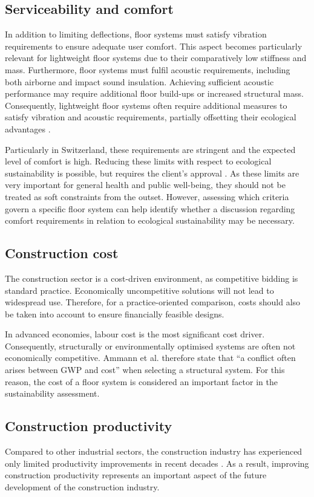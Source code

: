 \subsection{Serviceability and comfort \label{Sec: ServAndComf}}
In addition to limiting deflections, floor systems must satisfy vibration requirements to ensure adequate user comfort. This aspect becomes particularly relevant for lightweight floor systems due to their comparatively low stiffness and mass. Furthermore, floor systems must fulfil acoustic requirements, including both airborne and impact sound insulation. Achieving sufficient acoustic performance may require additional floor build-ups or increased structural mass. Consequently, lightweight floor systems often require additional measures to satisfy vibration and acoustic requirements, partially offsetting their ecological advantages \cite{BauphysikKalender}.

Particularly in Switzerland, these requirements are stringent and the expected level of comfort is high. Reducing these limits with respect to ecological sustainability is possible, but requires the client's approval \cite{Kaufmann2024_WhitePaper}. As these limits are very important for general health and public well-being, they should not be treated as soft constraints from the outset. However, assessing which criteria govern a specific floor system can help identify whether a discussion regarding comfort requirements in relation to ecological sustainability may be necessary.

\subsection{Construction cost \label{Sec: ConstructionCost}}
The construction sector is a cost-driven environment, as competitive bidding is standard practice. Economically uncompetitive solutions will not lead to widespread use. Therefore, for a practice-oriented comparison, costs should also be taken into account to ensure financially feasible designs.

In advanced economies, labour cost is the most significant cost driver. Consequently, structurally or environmentally optimised systems are often not economically competitive. Ammann et al. \cite{Ammann2024} therefore state that “a conflict often arises between GWP and cost” when selecting a structural system. For this reason, the cost of a floor system is considered an important factor in the sustainability assessment.

\subsection{Construction productivity \label{Sec: Productivity}}
Compared to other industrial sectors, the construction industry has experienced only limited productivity improvements in recent decades \cite{Wangler2019}. As a result, improving construction productivity represents an important aspect of the future development of the construction industry.

